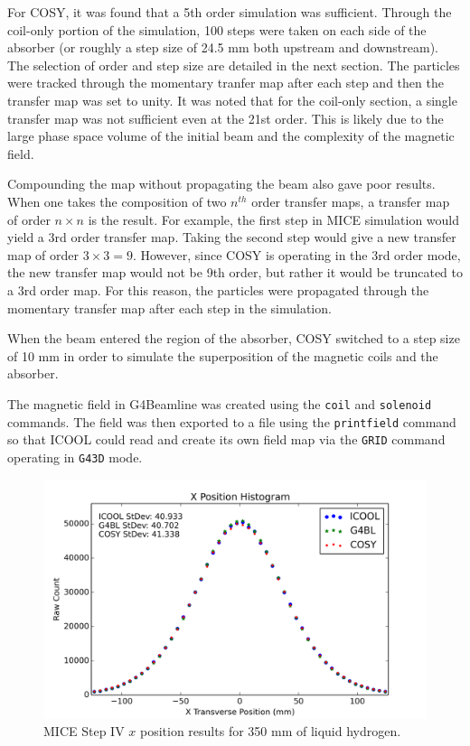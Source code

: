 For COSY, it was found that a 5th order simulation was sufficient. Through the coil-only portion of the simulation, 100 steps were taken on each side of the absorber (or roughly a step size of 24.5 mm both upstream and downstream). The selection of order and step size are detailed in the next section. The particles were tracked through the momentary tranfer map after each step and then the transfer map was set to unity. It was noted that for the coil-only section, a single transfer map was not sufficient even at the 21st order. This is likely due to the large phase space volume of the initial beam and the complexity of the magnetic field.

Compounding the map without propagating the beam also gave poor results. When one takes the composition of two $n^{th}$ order transfer maps, a transfer map of order $n\times n$ is the result. For example, the first step in MICE simulation would yield a 3rd order transfer map. Taking the second step would give a new transfer map of order $3\times 3 = 9$. However, since COSY is operating in the 3rd order mode, the new transfer map would not be 9th order, but rather it would be truncated to a 3rd order map. For this reason, the particles were propagated through the momentary transfer map after each step in the simulation.

When the beam entered the region of the absorber, COSY switched to a step size of 10 mm in order to simulate the superposition of the magnetic coils and the absorber.

The magnetic field in G4Beamline was created using the \texttt{coil} and \texttt{solenoid} commands. The field was then exported to a file using the \texttt{printfield} command so that ICOOL could read and create its own field map via the \texttt{GRID} command operating in \texttt{G43D} mode.

\begin{figure}[H]
  \centering
    \includegraphics[width=\textwidth]{MICE data/x} 
  \caption{MICE Step IV $x$ position results for 350 mm of liquid hydrogen.}
  \label{fig:micex}
\end{figure}


